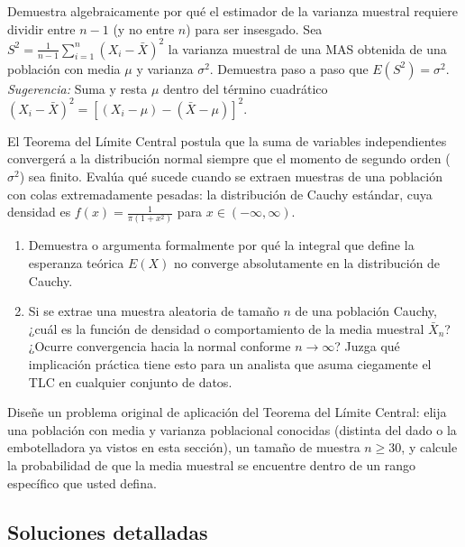 \begin{problema}
	\label{prob:0c980d4}
	Demuestra algebraicamente por qué el estimador de la varianza muestral requiere dividir entre $n-1$ (y no entre $n$) para ser insesgado. Sea $S^2 = \frac{1}{n-1} \sum_{i=1}^n (X_i - \bar{X})^2$ la varianza muestral de una MAS obtenida de una población con media $\mu$ y varianza $\sigma^2$. Demuestra paso a paso que $E(S^2) = \sigma^2$.
	\emph{Sugerencia:} Suma y resta $\mu$ dentro del término cuadrático $(X_i - \bar{X})^2 = [(X_i - \mu) - (\bar{X} - \mu)]^2$.
\end{problema}

\begin{problema}
	\label{prob:293fd20}
	El Teorema del Límite Central postula que la suma de variables independientes convergerá a la distribución normal siempre que el momento de segundo orden ($\sigma^2$) sea finito. Evalúa qué sucede cuando se extraen muestras de una población con colas extremadamente pesadas: la distribución de Cauchy estándar, cuya densidad es $f(x) = \frac{1}{\pi(1+x^2)}$ para $x \in (-\infty, \infty)$.
	\begin{enumerate}
		\item Demuestra o argumenta formalmente por qué la integral que define la esperanza teórica $E(X)$ no converge absolutamente en la distribución de Cauchy.
		\item Si se extrae una muestra aleatoria de tamaño $n$ de una población Cauchy, ¿cuál es la función de densidad o comportamiento de la media muestral $\bar{X}_n$? ¿Ocurre convergencia hacia la normal conforme $n \to \infty$? Juzga qué implicación práctica tiene esto para un analista que asuma ciegamente el TLC en cualquier conjunto de datos.
	\end{enumerate}
\end{problema}

\begin{problema}
	\label{prob:b7567ec}
	Diseñe un problema original de aplicación del Teorema del Límite Central: elija una población con media y varianza poblacional conocidas (distinta del dado o la embotelladora ya vistos en esta sección), un tamaño de muestra $n \ge 30$, y calcule la probabilidad de que la media muestral se encuentre dentro de un rango específico que usted defina.
\end{problema}

\subsection*{Soluciones detalladas}

